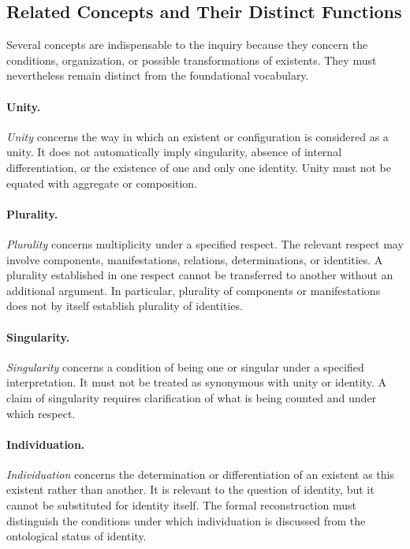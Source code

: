 \subsection{Related Concepts and Their Distinct Functions}

Several concepts are indispensable to the inquiry
because they concern the conditions, organization,
or possible transformations of existents. They
must nevertheless remain distinct from the
foundational vocabulary.

\paragraph{Unity.}

\emph{Unity} concerns the way in which an existent
or configuration is considered as a unity. It
does not automatically imply singularity, absence
of internal differentiation, or the existence
of one and only one identity. Unity must not
be equated with aggregate or composition.

\paragraph{Plurality.}

\emph{Plurality} concerns multiplicity under a
specified respect. The relevant respect may
involve components, manifestations, relations,
determinations, or identities. A plurality
established in one respect cannot be transferred
to another without an additional argument.
In particular, plurality of components or
manifestations does not by itself establish
plurality of identities.

\paragraph{Singularity.}

\emph{Singularity} concerns a condition of being
one or singular under a specified interpretation.
It must not be treated as synonymous with unity
or identity. A claim of singularity requires
clarification of what is being counted and under
which respect.

\paragraph{Individuation.}

\emph{Individuation} concerns the determination
or differentiation of an existent as this existent
rather than another. It is relevant to the
question of identity, but it cannot be substituted
for identity itself. The formal reconstruction
must distinguish the conditions under which
individuation is discussed from the ontological
status of identity.

